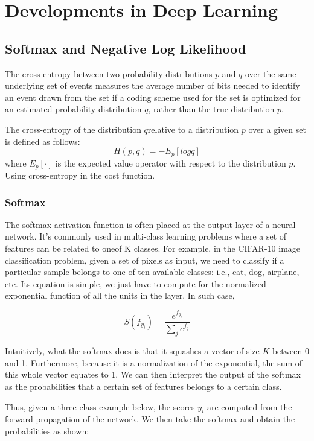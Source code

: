 \documentclass{report}
\begin{document}
\chapter{Developments in Deep Learning}

\section{Softmax and Negative Log Likelihood}
The cross-entropy between two probability distributions $p$ and $q$ over the same underlying set of events measures the average number of bits needed to identify an event drawn from the set if a coding scheme used for the set is optimized for an estimated probability distribution $q$, rather than the true distribution $p$.

The cross-entropy of the distribution $q $relative to a distribution $p$ over a given set is defined as follows:
$$H(p,q) = -E_p[log q]$$
where $E_{p}[\cdot ]$ is the expected value operator with respect to the distribution $p$. Using cross-entropy in the cost function.

\subsection{Softmax}

The softmax activation function is often placed at the output layer of a neural network. It’s commonly used in multi-class learning problems where a set of features can be related to oneof K  classes. For example, in the CIFAR-10 image classification problem, given a set of pixels as input, we need to classify if a particular sample belongs to one-of-ten available classes: i.e., cat, dog, airplane, etc. Its equation is simple, we just have to compute for the normalized exponential function of all the units in the layer. In such case,

$$S(f_{y_i}) = \frac{e^{f_{y_i}}}{\sum_j e^{f_j}}$$

Intuitively, what the softmax does is that it squashes a vector of size $K$ between 0 and 1. Furthermore, because it is a normalization of the exponential, the sum of this whole vector equates to 1. We can then interpret the output of the softmax as the probabilities that a certain set of features belongs to a certain class.

Thus, given a three-class example below, the scores $y_i$ are computed from the forward propagation of the network. We then take the softmax and obtain the probabilities as shown:
\end{document}
